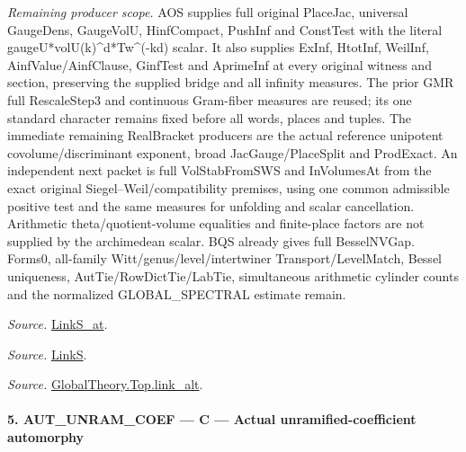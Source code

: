 \emph{Remaining producer scope.} AOS supplies full original PlaceJac, universal GaugeDens, GaugeVolU, HinfCompact, PushInf and ConstTest with the literal gaugeU*volU(k)\textasciicircum{}d*Tw\textasciicircum{}(-kd) scalar. It also supplies ExInf, HtotInf, WeilInf, AinfValue/AinfClause, GinfTest and AprimeInf at every original witness and section, preserving the supplied bridge and all infinity measures. The prior GMR full RescaleStep3 and continuous Gram-fiber measures are reused; its one standard character remains fixed before all words, places and tuples. The immediate remaining RealBracket producers are the actual reference unipotent covolume/discriminant exponent, broad JacGauge/PlaceSplit and ProdExact. An independent next packet is full VolStabFromSWS and InVolumesAt from the exact original Siegel–Weil/compatibility premises, using one common admissible positive test and the same measures for unfolding and scalar cancellation. Arithmetic theta/quotient-volume equalities and finite-place factors are not supplied by the archimedean scalar. BQS already gives full BesselNVGap. Forms0, all-family Witt/genus/level/intertwiner Transport/LevelMatch, Bessel uniqueness, AutTie/RowDictTie/LabTie, simultaneous arithmetic cylinder counts and the normalized GLOBAL\_\allowbreak SPECTRAL estimate remain.

\emph{Source.} \href{https://github.com/CocoSgt/riemann-hypothesis-lean/blob/7cbf7a0c32fca1badf05931879a37c3f8a2b03b4/src/Formalism/SharpRestriction/GlobalTheoremInputs.lean#L145-L149}{LinkS\_\allowbreak at}.

\emph{Source.} \href{https://github.com/CocoSgt/riemann-hypothesis-lean/blob/7cbf7a0c32fca1badf05931879a37c3f8a2b03b4/src/Formalism/SharpRestriction/GlobalTheoremInputs.lean#L152-L157}{LinkS}.

\emph{Source.} \href{https://github.com/CocoSgt/riemann-hypothesis-lean/blob/7cbf7a0c32fca1badf05931879a37c3f8a2b03b4/src/Development/AbelianVarietyTheory/Proofs/GlobalInterpolation/LinkAlt.lean#L16-L50}{GlobalTheory.Top.link\_\allowbreak alt}.



\paragraph{5. AUT\_\allowbreak UNRAM\_\allowbreak COEF — C — Actual unramified-coefficient automorphy}

